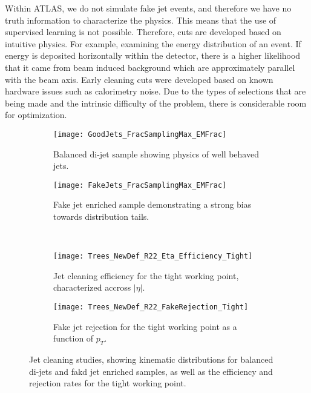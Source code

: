 \documentclass[12pt]{article}
\begin{document}
Within ATLAS, we do not simulate fake jet events, and therefore we have no truth
information to characterize the physics. This means that the use of supervised
learning is not possible. Therefore, cuts are developed based on intuitive
physics. For example, examining the energy distribution of an event. If energy
is deposited horizontally within the detector, there is a higher likelihood that
it came from beam induced background which are approximately parallel with the
beam axis. Early cleaning cuts were developed based on known hardware issues
such as calorimetry noise. Due to the types of selections that are being made
and the intrinsic difficulty of the problem, there is considerable room for
optimization. 

\begin{figure}[t!]
    \centering
    \begin{subfigure}[t]{.48\textwidth}
        \centering
        \texttt{[image: GoodJets\_FracSamplingMax\_EMFrac]}
        \caption{Balanced di-jet sample showing physics of well behaved jets.}
        \label{subfig:good_jets_th2}
    \end{subfigure}
    \hfill
    \begin{subfigure}[t]{.48\textwidth}
        \centering
        \texttt{[image: FakeJets\_FracSamplingMax\_EMFrac]}
        \caption{Fake jet enriched sample demonstrating a strong bias towards
        distribution tails.}
        \label{subfig:fake_jets_th2}
    \end{subfigure} %
    ~
    \begin{subfigure}[t]{.48\textwidth}
        \centering
        \texttt{[image: Trees\_NewDef\_R22\_Eta\_Efficiency\_Tight]}
        \caption{Jet cleaning efficiency for the tight working point,
        characterized accross $|\eta|$.}
        \label{subfig:cleaning_perf_th2_loose}
    \end{subfigure}
    \hfill
    \begin{subfigure}[t]{.48\textwidth}
        \centering
        \texttt{[image: Trees\_NewDef\_R22\_FakeRejection\_Tight]}
        \caption{Fake jet rejection for the tight working point as a function of
        $p_T$.}
        \label{subfig:cleaning_perf_th2_tight}
    \end{subfigure}
\caption{Jet cleaning studies, showing kinematic distributions for balanced
di-jets and fakd jet enriched samples, as well as the efficiency and rejection
rates for the tight working point.}
\label{fig:jet_cleaning}
\end{figure}
\end{document}
